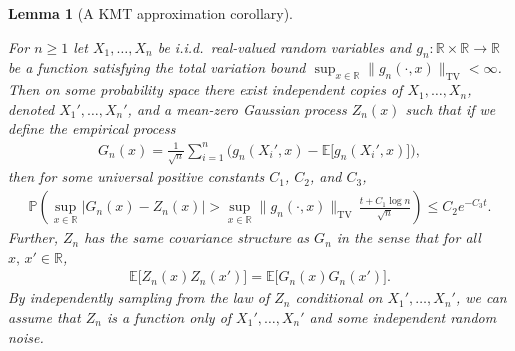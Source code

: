\documentclass[11pt,lof]{puthesis}
\renewcommand{\P}{\ensuremath{\mathbb{P}}}
\newcommand{\R}{\ensuremath{\mathbb{R}}}
\newcommand{\E}{\ensuremath{\mathbb{E}}}
\newcommand{\TV}{\mathrm{TV}}
\theoremstyle{break}
\newtheorem{lemma}{Lemma}[section]
\theoremstyle{proof}
\begin{document}
\begin{lemma}[A KMT approximation corollary]
  \label{lem:kernel_app_kmt_corollary}

  For $n \geq 1$
  let $X_1, \ldots, X_n$
  be i.i.d.\ real-valued random variables and
  $g_n: \R \times \R \to \R$
  be a function satisfying
  the total variation bound
  $\sup_{x \in \R} \|g_n(\cdot, x)\|_\TV < \infty$.
  Then on some probability space
  there exist independent copies of
  $X_1, \ldots, X_n$,
  denoted
  $X_1', \ldots, X_n'$,
  and a mean-zero Gaussian process $Z_n(x)$
  such that if we define
  the empirical process
  \begin{align*}
    G_n(x)
    = \frac{1}{\sqrt n} \sum_{i=1}^n
    \Big(g_n(X_i',x) - \E\big[g_n(X_i',x)\big]\Big),
  \end{align*}
  then
  for some universal positive constants
  $C_1$, $C_2$, and $C_3$,
  \begin{align*}
    \P\left(
      \sup_{x \in \R}
      \big|G_n(x) - Z_n(x)\big|
      > \sup_{x \in \R} \|g_n(\cdot, x)\|_\TV
      \, \frac{t + C_1 \log n}{\sqrt n}
    \right)
    \leq C_2 e^{-C_3 t}.
  \end{align*}
  Further, $Z_n$
  has the same covariance structure as $G_n$
  in the sense that for all $x,\, x' \in \R$,
  \begin{align*}
    \E\big[Z_n(x) Z_n(x')\big]
    = \E\big[G_n(x) G_n(x')\big].
  \end{align*}
  By independently sampling from the law of
  $Z_n$ conditional on $X_1', \ldots, X_n'$,
  we can assume that
  $Z_n$ is a function only of $X_1', \ldots, X_n'$
  and some independent random noise.

\end{lemma}
\end{document}
